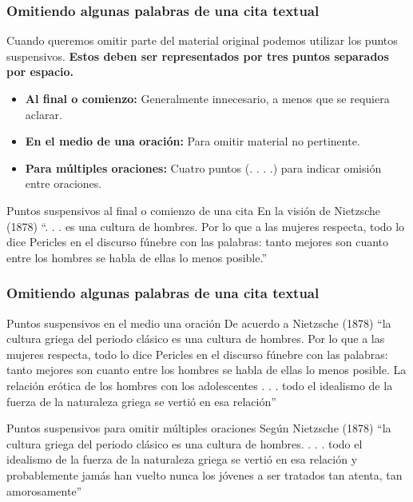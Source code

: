 \documentclass[
11pt, %
]{beamer}
\begin{document}
\begin{frame}
	\frametitle{Omitiendo algunas palabras de una cita textual}

	Cuando queremos omitir parte del material original podemos utilizar los puntos suspensivos. \textbf{Estos deben ser representados por tres puntos separados por espacio.}

	\begin{itemize}
		\item \textbf{Al final o comienzo:} Generalmente innecesario, a menos que se requiera aclarar.
		\item \textbf{En el medio de una oración:} Para omitir material no pertinente.
		\item \textbf{Para múltiples oraciones:} Cuatro puntos (. . . .) para indicar omisión entre oraciones.
	\end{itemize}

	\begin{exampleblock}{Puntos suspensivos al final o comienzo de una cita}
		En la visión de Nietzsche (1878) ``{\color{blue}. . .} es una cultura de hombres. Por lo que a las mujeres respecta, todo lo dice Pericles en el discurso fúnebre con las palabras: tanto mejores son cuanto entre los hombres se habla de ellas lo menos posible.''
	\end{exampleblock}

\end{frame}

\begin{frame}
	\frametitle{Omitiendo algunas palabras de una cita textual}

	\begin{exampleblock}{Puntos suspensivos en el medio una oración}
		De acuerdo a Nietzsche (1878) ``la cultura griega del periodo clásico es una cultura de hombres. Por lo que a las mujeres respecta, todo lo dice Pericles en el discurso fúnebre con las palabras: tanto mejores son cuanto entre los hombres se habla de ellas lo menos posible. La relación erótica de los hombres con los adolescentes{\color{blue} . . .} todo el idealismo de la fuerza de la naturaleza griega se vertió en esa relación''
	\end{exampleblock}

	\begin{exampleblock}{Puntos suspensivos para omitir múltiples oraciones}
		Según Nietzsche (1878) ``la cultura griega del periodo clásico es una cultura de hombres{\color{red}.} {\color{blue}. . .} todo el idealismo de la fuerza de la naturaleza griega se vertió en esa relación y probablemente jamás han vuelto nunca los jóvenes a ser tratados tan atenta, tan amorosamente''
	\end{exampleblock}

\end{frame}
\end{document}
